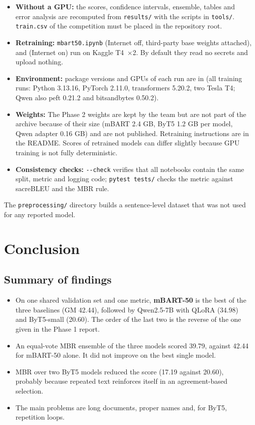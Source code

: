 \documentclass[a4paper,12pt]{article}
\begin{document}
\begin{itemize}
    \item \textbf{Without a GPU:} the scores, confidence intervals, ensemble, tables and error analysis are recomputed from \texttt{results/} with the scripts in \texttt{tools/}. \texttt{train.csv} of the competition must be placed in the repository root.
    \item \textbf{Retraining:} \texttt{mbart50.ipynb} (Internet off, third-party base weights attached),  and  (Internet on) run on Kaggle T4~$\times$2. By default they read no secrets and upload nothing.
    \item \textbf{Environment:} package versions and GPUs of each run are in  (all training runs: Python 3.13.16, PyTorch 2.11.0, transformers 5.20.2, two Tesla T4; Qwen also peft 0.21.2 and bitsandbytes 0.50.2).
    \item \textbf{Weights:} The Phase 2 weights are kept by the team but are not part of the archive because of their size (mBART 2.4 GB, ByT5 1.2 GB per model, Qwen adapter 0.16 GB) and are not published. Retraining instructions are in the README. Scores of retrained models can differ slightly because GPU training is not fully deterministic.
    \item \textbf{Consistency checks:}  \texttt{-{}-check} verifies that all notebooks contain the same split, metric and logging code; \texttt{pytest tests/} checks the metric against sacreBLEU and the MBR rule.
\end{itemize}

The \texttt{preprocessing/} directory builds a sentence-level dataset that was not used for any reported model.

\section{Conclusion}

\subsection{Summary of findings}
\begin{itemize}
    \item On one shared validation set and one metric, \textbf{mBART-50} is the best of the three baselines (GM 42.44), followed by Qwen2.5-7B with QLoRA (34.98) and ByT5-small (20.60). The order of the last two is the reverse of the one given in the Phase 1 report.
    \item An equal-vote MBR ensemble of the three models scored 39.79, against 42.44 for mBART-50 alone. It did not improve on the best single model.
    \item MBR over two ByT5 models reduced the score (17.19 against 20.60), probably because repeated text reinforces itself in an agreement-based selection.
    \item The main problems are long documents, proper names and, for ByT5, repetition loops.
\end{itemize}
\end{document}
